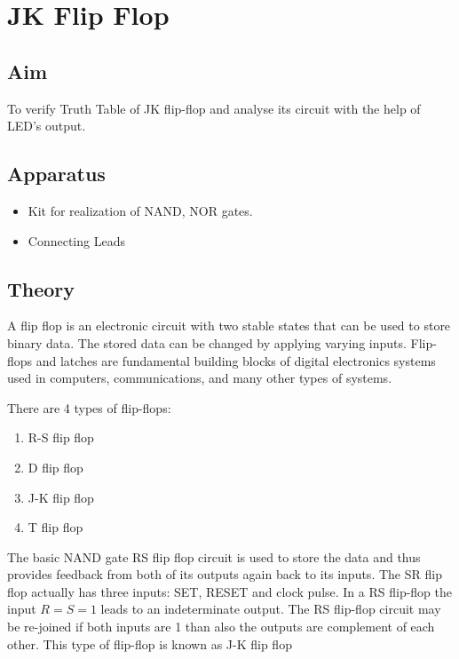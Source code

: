 \chapter{JK Flip Flop}

\section{Aim}
To verify Truth Table of JK flip-flop and analyse its circuit with the help of LED's output.

\section{Apparatus}
\begin{itemize}
	\tightlist
	\item Kit for realization of NAND, NOR gates.
	\item Connecting Leads
\end{itemize}

\section{Theory}
	A flip flop is an electronic circuit with two stable states that can be used to store binary data. The stored data can be changed by applying varying inputs. Flip-flops and latches are fundamental building blocks of digital electronics systems used in computers, communications, and many other types of systems.
	
	There are 4 types of flip-flops:
	\begin{enumerate}
		\tightlist
		\item R-S flip flop
		\item D flip flop
		\item J-K flip flop
		\item T flip flop
	\end{enumerate}

	The basic NAND gate RS flip flop circuit is used to store the data and thus provides feedback from both of its outputs again back to its inputs. The SR flip flop actually has three inputs: SET, RESET and clock pulse. In a RS flip-flop the input $R=S=1$ leads to an indeterminate output. The RS flip-flop circuit may be re-joined if both inputs are 1 than also the outputs are complement of each other. This type of flip-flop is known as J-K flip flop

